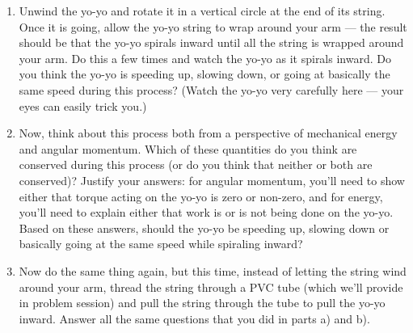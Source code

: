 \begin{exercise}
  \begin{enumerate}
  \item Unwind the yo-yo and rotate it in a vertical circle at the end
    of its string.  Once it is going, allow the yo-yo string to wrap
    around your arm --- the result should be that the yo-yo spirals
    inward until all the string is wrapped around your arm.  Do this a
    few times and watch the yo-yo as it spirals inward.  Do you think
    the yo-yo is speeding up, slowing down, or going at basically the
    same speed during this process?  (Watch the yo-yo very carefully
    here --- your eyes can easily trick you.)

  \item Now, think about this process both from a perspective of
    mechanical energy and angular momentum.  Which of these quantities
    do you think are conserved during this process (or do you think
    that neither or both are conserved)?  Justify your answers: for
    angular momentum, you'll need to show either that torque acting on
    the yo-yo is zero or non-zero, and for energy, you'll need to
    explain either that work is or is not being done on the yo-yo.
    Based on these answers, should the yo-yo be speeding up, slowing
    down or basically going at the same speed while spiraling inward?

  \item Now do the same thing again, but this time, instead of letting
    the string wind around your arm, thread the string through a PVC
    tube (which we'll provide in problem session) and pull the string
    through the tube to pull the yo-yo inward.  Answer all the same
    questions that you did in parts a) and b).
  \end{enumerate}
\end{exercise}

